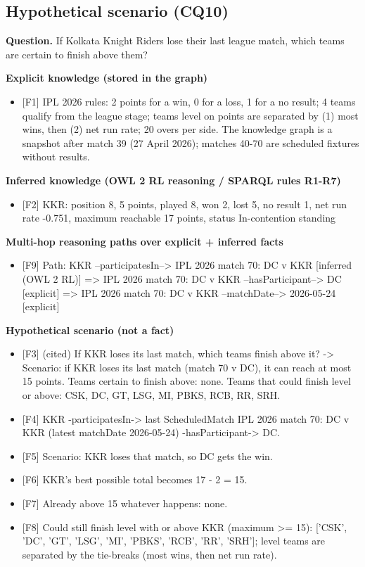 \subsection{Hypothetical scenario (CQ10)}
\noindent\textbf{Question.} If Kolkata Knight Riders lose their last league match, which teams are certain to finish above them?\par\smallskip
\noindent\textcolor{kgexplicit}{\textbf{Explicit knowledge (stored in the graph)}}
\begin{itemize}\setlength\itemsep{0pt}\footnotesize
\item{} [F1] IPL 2026 rules: 2 points for a win, 0 for a loss, 1 for a no result; 4 teams qualify from the league stage; teams level on points are separated by (1) most wins, then (2) net run rate; 20 overs per side. The knowledge graph is a snapshot after match 39 (27 April 2026); matches 40-70 are scheduled fixtures without results.
\end{itemize}
\noindent\textcolor{kginferred}{\textbf{Inferred knowledge (OWL 2 RL reasoning / SPARQL rules R1-R7)}}
\begin{itemize}\setlength\itemsep{0pt}\footnotesize
\item{} [F2] KKR: position 8, 5 points, played 8, won 2, lost 5, no result 1, net run rate -0.751, maximum reachable 17 points, status In-contention standing
\end{itemize}
\noindent\textcolor{kgpath}{\textbf{Multi-hop reasoning paths over explicit + inferred facts}}
\begin{itemize}\setlength\itemsep{0pt}\footnotesize
\item{} [F9] Path: KKR --participatesIn--\textgreater{} IPL 2026 match 70: DC v KKR [inferred (OWL 2 RL)] =\textgreater{} IPL 2026 match 70: DC v KKR --hasParticipant--\textgreater{} DC [explicit] =\textgreater{} IPL 2026 match 70: DC v KKR --matchDate--\textgreater{} 2026-05-24 [explicit]
\end{itemize}
\noindent\textcolor{kgscenario}{\textbf{Hypothetical scenario (not a fact)}}
\begin{itemize}\setlength\itemsep{0pt}\footnotesize
\item{} [F3] (cited) If KKR loses its last match, which teams finish above it? -\textgreater{} Scenario: if KKR loses its last match (match 70 v DC), it can reach at most 15 points. Teams certain to finish above: none. Teams that could finish level or above: CSK, DC, GT, LSG, MI, PBKS, RCB, RR, SRH.
\item{} [F4] KKR -participatesIn-\textgreater{} last ScheduledMatch IPL 2026 match 70: DC v KKR (latest matchDate 2026-05-24) -hasParticipant-\textgreater{} DC.
\item{} [F5] Scenario: KKR loses that match, so DC gets the win.
\item{} [F6] KKR's best possible total becomes 17 - 2 = 15.
\item{} [F7] Already above 15 whatever happens: none.
\item{} [F8] Could still finish level with or above KKR (maximum \textgreater{}= 15): ['CSK', 'DC', 'GT', 'LSG', 'MI', 'PBKS', 'RCB', 'RR', 'SRH']; level teams are separated by the tie-breaks (most wins, then net run rate).
\end{itemize}
